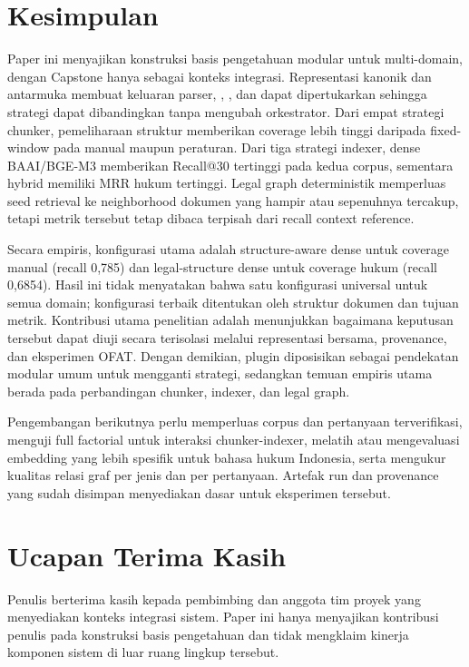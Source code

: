 \section{Kesimpulan}

Paper ini menyajikan konstruksi basis pengetahuan modular untuk \omnirag multi-domain, dengan Capstone hanya sebagai konteks integrasi. Representasi kanonik dan antarmuka \plugin membuat keluaran parser, \chunker, \indexer, dan \kg dapat dipertukarkan sehingga strategi dapat dibandingkan tanpa mengubah orkestrator. Dari empat strategi chunker, pemeliharaan struktur memberikan coverage lebih tinggi daripada fixed-window pada manual maupun peraturan. Dari tiga strategi indexer, dense BAAI/BGE-M3 memberikan Recall@30 tertinggi pada kedua corpus, sementara hybrid memiliki MRR hukum tertinggi. Legal graph deterministik memperluas seed retrieval ke neighborhood dokumen yang hampir atau sepenuhnya tercakup, tetapi metrik tersebut tetap dibaca terpisah dari recall context reference.

Secara empiris, konfigurasi utama adalah structure-aware dense untuk coverage manual (recall 0,785) dan legal-structure dense untuk coverage hukum (recall 0,6854). Hasil ini tidak menyatakan bahwa satu konfigurasi universal untuk semua domain; konfigurasi terbaik ditentukan oleh struktur dokumen dan tujuan metrik. Kontribusi utama penelitian adalah menunjukkan bagaimana keputusan tersebut dapat diuji secara terisolasi melalui representasi bersama, provenance, dan eksperimen OFAT. Dengan demikian, plugin diposisikan sebagai pendekatan modular umum untuk mengganti strategi, sedangkan temuan empiris utama berada pada perbandingan chunker, indexer, dan legal graph.

Pengembangan berikutnya perlu memperluas corpus dan pertanyaan terverifikasi, menguji full factorial untuk interaksi chunker-indexer, melatih atau mengevaluasi embedding yang lebih spesifik untuk bahasa hukum Indonesia, serta mengukur kualitas relasi graf per jenis dan per pertanyaan. Artefak run dan provenance yang sudah disimpan menyediakan dasar untuk eksperimen tersebut.

\section*{Ucapan Terima Kasih}

Penulis berterima kasih kepada pembimbing dan anggota tim proyek yang menyediakan konteks integrasi sistem. Paper ini hanya menyajikan kontribusi penulis pada konstruksi basis pengetahuan dan tidak mengklaim kinerja komponen sistem di luar ruang lingkup tersebut.
